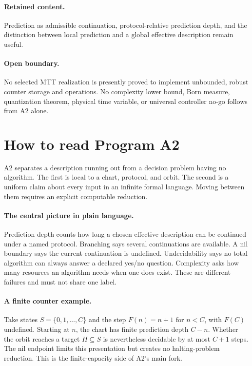 \documentclass[11pt]{article}
\begin{document}
\paragraph{Retained content.}
Prediction as admissible continuation, protocol-relative prediction depth,
and the distinction between local prediction and a global effective
description remain useful.
\paragraph{Open boundary.}
No selected MTT realization is presently proved to implement unbounded,
robust counter storage and operations.  No complexity lower bound, Born
measure, quantization theorem, physical time variable, or universal controller
no-go follows from A2 alone.

\section*{How to read Program A2}
A2 separates a description running out from a decision problem having no
algorithm.  The first is local to a chart, protocol, and orbit.  The second is
a uniform claim about every input in an infinite formal language.  Moving
between them requires an explicit computable reduction.

\paragraph{The central picture in plain language.}
Prediction depth counts how long a chosen effective description can be
continued under a named protocol.  Branching says several continuations are
available.  A nil boundary says the current continuation is undefined.
Undecidability says no total algorithm can always answer a declared yes/no
question.  Complexity asks how many resources an algorithm needs when one
does exist.  These are different failures and must not share one label.

\paragraph{A finite counter example.}
Take states $S=\{0,1,\ldots,C\}$ and the step
$F(n)=n+1$ for $n<C$, with $F(C)$ undefined.  Starting at $n$, the chart has
finite prediction depth $C-n$.  Whether the orbit reaches a target
$H\subseteq S$ is nevertheless decidable by at most $C+1$ steps.  The nil
endpoint limits this presentation but creates no halting-problem reduction.
This is the finite-capacity side of A2's main fork.
\end{document}
